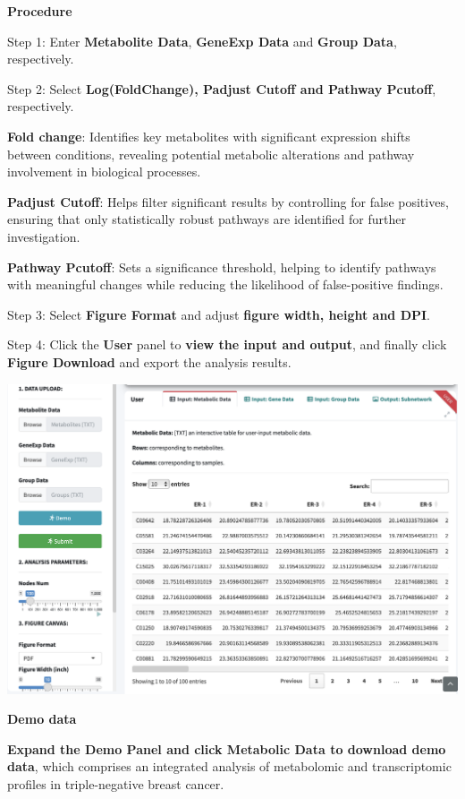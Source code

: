 \documentclass[
]{book}
\begin{document}
\textbf{Procedure}

Step 1: Enter \textbf{Metabolite Data}, \textbf{GeneExp Data} and \textbf{Group Data}, respectively.

Step 2: Select \textbf{Log(FoldChange), Padjust Cutoff and Pathway Pcutoff}, respectively.

\textbf{Fold change}: Identifies key metabolites with significant expression shifts between conditions, revealing potential metabolic alterations and pathway involvement in biological processes.

\textbf{Padjust Cutoff}: Helps filter significant results by controlling for false positives, ensuring that only statistically robust pathways are identified for further investigation.

\textbf{Pathway Pcutoff}: Sets a significance threshold, helping to identify pathways with meaningful changes while reducing the likelihood of false-positive findings.

Step 3: Select \textbf{Figure Format} and adjust \textbf{figure width, height and DPI}.

Step 4: Click the \textbf{User} panel to \textbf{view the input and output}, and finally click \textbf{Figure Download} and export the analysis results.

\begin{center}\includegraphics[width=33.5in]{figure/1.M-G} \end{center}

\textbf{Demo data}

\textbf{Expand the Demo Panel and click Metabolic Data to download demo data}, which comprises an integrated analysis of metabolomic and transcriptomic profiles in triple-negative breast cancer.
\end{document}
